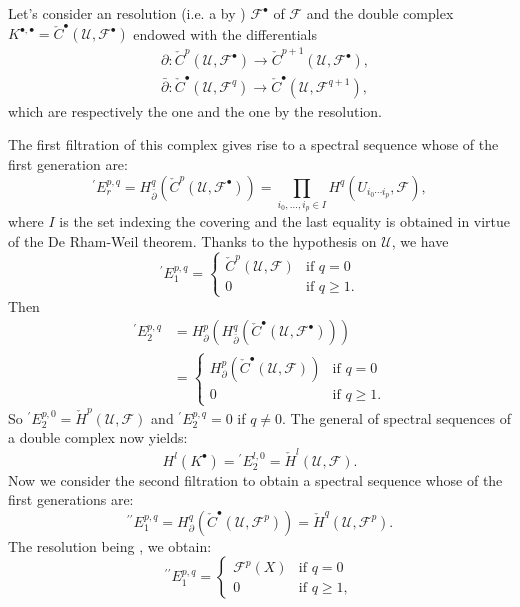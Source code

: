 \documentclass[12pt]{article}
\newcommand{\F}{\mathcal F}
\begin{document}
Let's consider an  resolution (i.e. a  by ) $\F^\bullet$ of $\F$ and the double complex $K^{\bullet,\bullet}=
\check C^\bullet(\mathcal U,\F^\bullet)$ endowed with the differentials
$$
\begin{aligned}
& \partial\colon\check C^p(\mathcal U,\F^\bullet)\to
\check C^{p+1}(\mathcal U,\F^\bullet),\\
& \bar\partial\colon\check C^\bullet(\mathcal U,\F^{q})\to
\check C^\bullet(\mathcal U,\F^{q+1}),
\end{aligned}
$$
which are respectively the  one and the one  by the resolution.

The first filtration of this complex gives rise to a spectral sequence whose  of the first generation are:
$$
{^\prime\!E^{p,q}_r}=H^q_{\bar\partial}
(\check C^p(\mathcal U,\F^\bullet))=\prod_{i_0,\dots,i_p\in I}
H^q(U_{i_0\cdots i_p},\F),
$$
where $I$ is the set indexing the covering and the last equality is obtained in virtue of the De Rham-Weil theorem.
Thanks to the hypothesis on $\mathcal U$, we have
$$
{^\prime\!E^{p,q}_1}=
\begin{cases}
\check C^p(\mathcal U,\F) & \text{if $q=0$} \\
0 & \text{if $q\ge 1$}.
\end{cases}
$$
Then
$$
\begin{aligned}
{^\prime\!E^{p,q}_2}
&=H^p_\partial(H^q_{\bar\partial}
(\check C^\bullet(\mathcal U,\F^\bullet))) \\
&=
\begin{cases}
H^p_\partial(\check C^\bullet(\mathcal U,\F)) & \text{if $q=0$} \\
0 & \text{if $q\ge 1$}.
\end{cases}
\end{aligned}
$$
So ${^\prime\!E^{p,0}_2}=\check H^p(\mathcal U,\F)$ and 
${^\prime\!E^{p,q}_2}=0$ if $q\ne 0$. The general  of spectral sequences of a double complex now yields:
$$
H^l(K^\bullet)={^\prime\!E^{l,0}_2}=\check H^l(\mathcal U,\F).
$$
Now we consider the second filtration to obtain a spectral sequence whose  of the first generations are:
$$
{^{\prime\prime}\!E^{p,q}_1}=H^q_\partial(\check C^\bullet(\mathcal U,\F^{p}))
=\check H^q(\mathcal U,\F^{p}).
$$
The resolution being , we obtain:
$$
{^{\prime\prime}\!E^{p,q}_1}=
\begin{cases}
\F^p(X) & \text{if $q=0$} \\
0 & \text{if $q\ge 1$},
\end{cases}
$$
\end{document}

